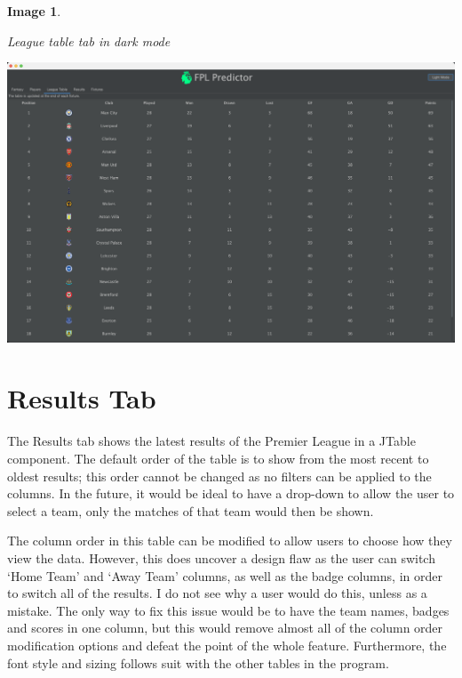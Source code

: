 \documentclass[12pt, a4paper, oneside]{book}
\newtheorem{image}[theorem]{Image}
\numberwithin{equation}{section}
\begin{document}
\begin{image} \label{League table tab in dark mode}

  League table tab in dark mode

  \vspace{0.5cm}

  \centerline{\includegraphics[width=1\textwidth]{images/gui/league-table-tab/dark.png}}

\end{image}

\section{Results Tab}\label{sec:8.8}

The Results tab shows the latest results of the Premier League in a JTable component. The default order of the table is to show from the most recent to oldest results; this order cannot be changed as no filters can be applied to the columns. In the future, it would be ideal to have a drop-down to allow the user to select a team, only the matches of that team would then be shown.

The column order in this table can be modified to allow users to choose how they view the data. However, this does uncover a design flaw as the user can switch `Home Team' and `Away Team' columns, as well as the badge columns, in order to switch all of the results. I do not see why a user would do this, unless as a mistake. The only way to fix this issue would be to have the team names, badges and scores in one column, but this would remove almost all of the column order modification options and defeat the point of the whole feature. Furthermore, the font style and sizing follows suit with the other tables in the program.
\end{document}
